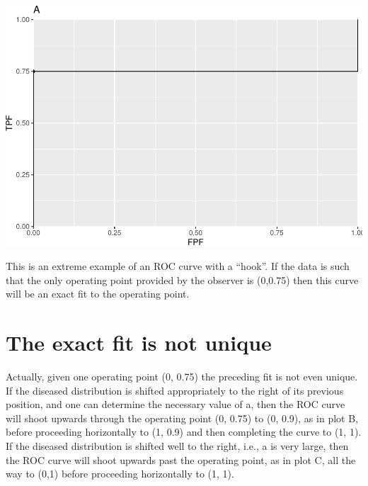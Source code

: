 \documentclass[]{book}
\begin{document}
\begin{center}\includegraphics{22-DegenerateROCs_files/figure-latex/unnamed-chunk-2-1} \end{center}

This is an extreme example of an ROC curve with a ``hook''. If the data is such that the only operating point provided by the observer is (0,0.75) then this curve will be an exact fit to the operating point.

\hypertarget{the-exact-fit-is-not-unique}{%
\section{The exact fit is not unique}\label{the-exact-fit-is-not-unique}}

Actually, given one operating point (0, 0.75) the preceding fit is not even unique. If the diseased distribution is shifted appropriately to the right of its previous position, and one can determine the necessary value of a, then the ROC curve will shoot upwards through the operating point (0, 0.75) to (0, 0.9), as in plot B, before proceeding horizontally to (1, 0.9) and then completing the curve to (1, 1). If the diseased distribution is shifted well to the right, i.e., a is very large, then the ROC curve will shoot upwards past the operating point, as in plot C, all the way to (0,1) before proceeding horizontally to (1, 1).
\end{document}
